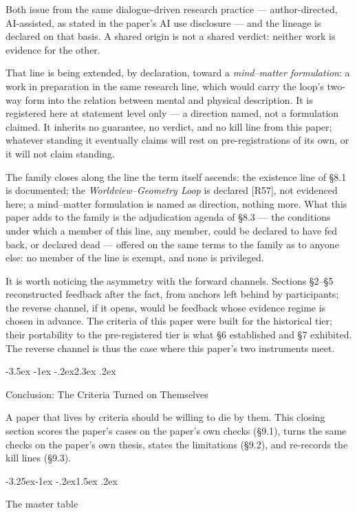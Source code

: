 \documentclass[11pt,a4paper]{article}
\makeatletter
\renewcommand\section{\@startsection{section}{1}{\z@}%
  {-3.5ex \@plus -1ex \@minus -.2ex}{2.3ex \@plus .2ex}%
  {\normalfont\Large\bfseries\raggedright}}
\renewcommand\subsection{\@startsection{subsection}{2}{\z@}%
  {-3.25ex\@plus -1ex \@minus -.2ex}{1.5ex \@plus .2ex}%
  {\normalfont\large\bfseries\raggedright}}
\makeatother
\begin{document}
Both issue from the same dialogue-driven research practice — author-directed, AI-assisted, as stated in the paper's AI use disclosure — and the lineage is declared on that basis. A shared origin is not a shared verdict: neither work is evidence for the other.

That line is being extended, by declaration, toward a \textit{mind--matter formulation}: a work in preparation in the same research line, which would carry the loop's two-way form into the relation between mental and physical description. It is registered here at statement level only — a direction named, not a formulation claimed. It inherits no guarantee, no verdict, and no kill line from this paper; whatever standing it eventually claims will rest on pre-registrations of its own, or it will not claim standing.

The family closes along the line the term itself ascends: the existence line of §8.1 is documented; the \textit{Worldview--Geometry Loop} is declared [R57], not evidenced here; a mind--matter formulation is named as direction, nothing more. What this paper adds to the family is the adjudication agenda of §8.3 — the conditions under which a member of this line, any member, could be declared to have fed back, or declared dead — offered on the same terms to the family as to anyone else: no member of the line is exempt, and none is privileged.

It is worth noticing the asymmetry with the forward channels. Sections §2–§5 reconstructed feedback after the fact, from anchors left behind by participants; the reverse channel, if it opens, would be feedback whose evidence regime is chosen in advance. The criteria of this paper were built for the historical tier; their portability to the pre-registered tier is what §6 established and §7 exhibited. The reverse channel is thus the case where this paper's two instruments meet.

\section{Conclusion: The Criteria Turned on Themselves}

A paper that lives by criteria should be willing to die by them. This closing section scores the paper's cases on the paper's own checks (§9.1), turns the same checks on the paper's own thesis, states the limitations (§9.2), and re-records the kill lines (§9.3).

\subsection{The master table}
\end{document}

